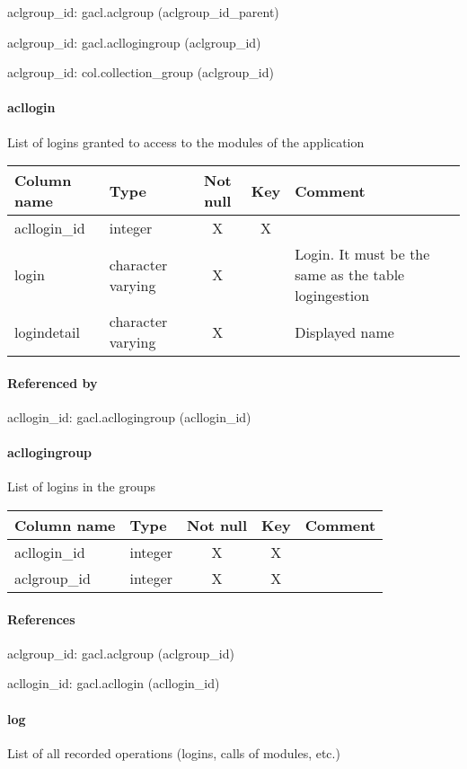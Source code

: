 aclgroup\_id: gacl.aclgroup (aclgroup\_id\_parent)

aclgroup\_id: gacl.acllogingroup (aclgroup\_id)

aclgroup\_id: col.collection\_group (aclgroup\_id)

\paragraph{acllogin}
List of logins granted to access to the modules of the application

\begin{tabular}{|l| p{2cm}|c|c| p{5cm}|}
\hline
Column name & Type & Not null & Key & Comment \\
\hline
acllogin\_id & integer & X & X & \\
login & character varying & X &  & Login. It must be the same as the table logingestion\\
logindetail & character varying & X &  & Displayed name\\
\hline
\end{tabular}
\paragraph{Referenced by}
acllogin\_id: gacl.acllogingroup (acllogin\_id)

\paragraph{acllogingroup}
List of logins in the groups

\begin{tabular}{|l| p{2cm}|c|c| p{5cm}|}
\hline
Column name & Type & Not null & Key & Comment \\
\hline
acllogin\_id & integer & X & X & \\
aclgroup\_id & integer & X & X & \\
\hline
\end{tabular}
\paragraph{References}
aclgroup\_id: gacl.aclgroup (aclgroup\_id)

acllogin\_id: gacl.acllogin (acllogin\_id)

\paragraph{log}
List of all recorded operations (logins, calls of modules, etc.)

